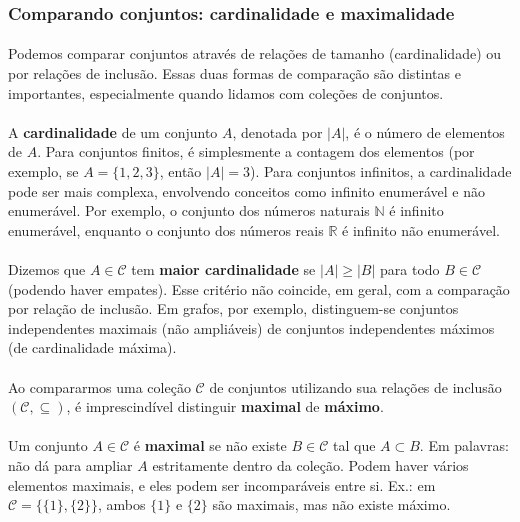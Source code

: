\documentclass[12pt,a4paper]{article}
\def\emph#1{#1}%
\begin{document}
\subsubsection{Comparando conjuntos: cardinalidade e maximalidade}

\paragraph{}
Podemos comparar conjuntos através de relações de tamanho (cardinalidade) ou por relações de inclusão. Essas duas formas de comparação são distintas e importantes, especialmente quando lidamos com coleções de conjuntos.

\paragraph{}
A \textbf{cardinalidade} de um conjunto \(A\), denotada por \(|A|\), é o número de elementos de \(A\). Para conjuntos finitos, é simplesmente a contagem dos elementos (por exemplo, se \(A=\{1,2,3\}\), então \(|A|=3\)). Para conjuntos infinitos, a cardinalidade pode ser mais complexa, envolvendo conceitos como infinito enumerável e não enumerável. Por exemplo, o conjunto dos números naturais \(\mathbb{N}\) é infinito enumerável, enquanto o conjunto dos números reais \(\mathbb{R}\) é infinito não enumerável.

\paragraph{}
Dizemos que \(A\in\mathcal{C}\) tem \textbf{maior cardinalidade} se \(|A|\ge |B|\) para todo \(B\in\mathcal{C}\) (podendo haver empates). Esse critério não coincide, em geral, com a comparação por relação de inclusão. Em grafos, por exemplo, distinguem-se conjuntos independentes \emph{maximais} (não ampliáveis) de conjuntos independentes \emph{máximos} (de cardinalidade máxima).

\paragraph{}
Ao compararmos uma coleção \(\mathcal{C}\) de conjuntos utilizando sua relações de inclusão \((\mathcal{C},\subseteq)\), é imprescindível distinguir \textbf{maximal} de \textbf{máximo}.

\paragraph{}
Um conjunto \(A\in\mathcal{C}\) é \textbf{maximal} se não existe \(B\in\mathcal{C}\) tal que \(A\subset B\). Em palavras: não dá para ampliar \(A\) estritamente dentro da coleção. Podem haver vários elementos maximais, e eles podem ser incomparáveis entre si. Ex.: em \(\mathcal{C}=\big\{\{1\},\{2\}\big\}\), ambos \(\{1\}\) e \(\{2\}\) são maximais, mas não existe máximo.
\end{document}
